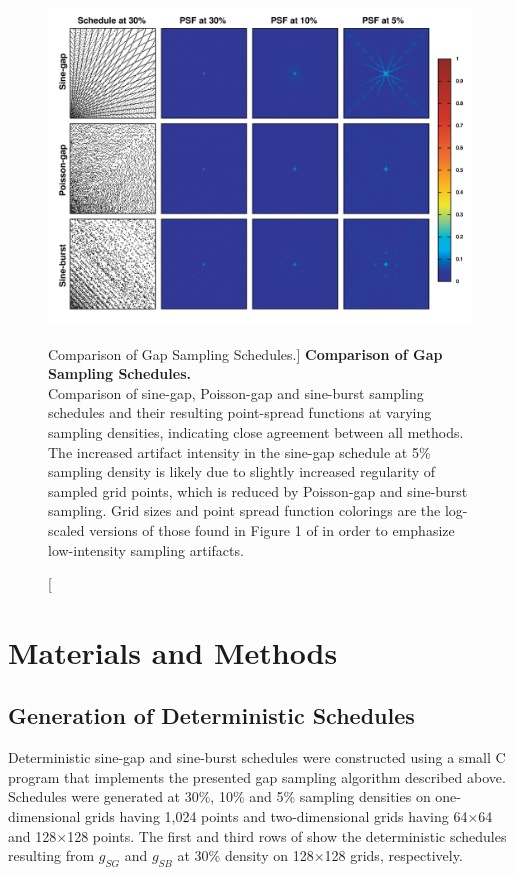 \begin{figure}[ht!]
\includegraphics[width=6in]{figs/dgs/05-psf.png}
\caption
      [Comparison of Gap Sampling Schedules.]{
  {\bf Comparison of Gap Sampling Schedules.}
  \\
  Comparison of sine-gap, Poisson-gap and sine-burst sampling schedules and
  their resulting point-spread functions at varying sampling densities,
  indicating close agreement between all methods. The increased artifact
  intensity in the sine-gap schedule at 5\% sampling density is likely due
  to slightly increased regularity of sampled grid points, which is reduced
  by Poisson-gap and sine-burst sampling. Grid sizes and point spread function
  colorings are the log-scaled versions of those found in Figure 1 of
  \cite{hoch:acr2014} in order to emphasize low-intensity sampling artifacts.
}
\label{figure.2.5}
\end{figure}

\section{Materials and Methods}

\subsection{Generation of Deterministic Schedules}

\begin{doublespace}
Deterministic sine-gap and sine-burst schedules were constructed using a small
C program that implements the presented gap sampling algorithm described above.
Schedules were generated at 30\%, 10\% and 5\% sampling densities on
one-dimensional grids having 1,024 points and two-dimensional grids having
64$\times$64 and 128$\times$128 points. The first and third rows of
 show the deterministic schedules resulting
from $g_{SG}$ and $g_{SB}$ at 30\% density on 128$\times$128 grids,
respectively.
\end{doublespace}


